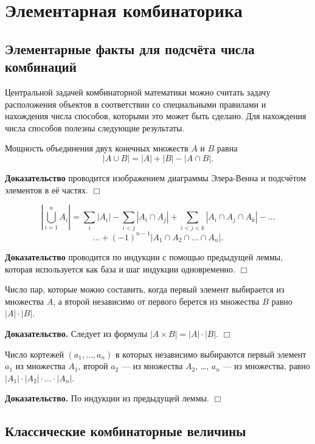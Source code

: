 \section{Элементарная комбинаторика}

\subsection{Элементарные факты для подсчёта числа комбинаций}

Центральной задачей комбинаторной математики можно считать задачу расположения объектов в соответствии со специальными правилами и нахождения числа способов, которыми это может быть сделано.
Для нахождения числа способов полезны следующие результаты.

\begin{lemma}%
	Мощность объединения двух конечных множеств $A$ и $B$ равна
	$$|A\cup B| = |A| + |B| - |A\cap B|.$$
\end{lemma}
\textbf{Доказательство} проводится изображением диаграммы Элера-Венна и подсчётом элементов в её частях. $\Box$


\begin{lemma}
	$$\left|\bigcup_{i=1}^{n}A_i \right| = \sum_{i} | A_i | - \sum_{i<j} | A_i \cap A_j | + \sum_{i<j<k} | A_i \cap A_j \cap A_k | - \ldots$$
	$$\ldots + (-1)^{n-1} | A_1 \cap A_2 \cap \ldots \cap A_n |.$$
\end{lemma}
\noindent\textbf{Доказательство} проводится по индукции с помощью предыдущей леммы, которая используется как база и шаг индукции одновременно. $\Box$

\begin{lemma}%
	Число пар, которые можно составить, когда первый элемент выбирается из множества $A$, а второй независимо от первого берется из множества $B$ равно $|A|\cdot|B|$.
\end{lemma}
\noindent\textbf{Доказательство.} Следует из формулы $|A\times B| = |A|\cdot|B|$. $\Box$


\begin{lemma}%
	Число кортежей $(a_1, \ldots, a_n)$ в которых независимо выбираются первый элемент $a_1$ из множества $A_1$, второй $a_2$ --- из множества $A_2$, \ldots, $a_n$ --- из множества, равно  $|A_1|\cdot|A_2|\cdot\ldots\cdot|A_n|$.
\end{lemma}
\noindent\textbf{Доказательство.} По индукции из предыдущей леммы. $\Box$

\subsection{Классические комбинаторные величины}

